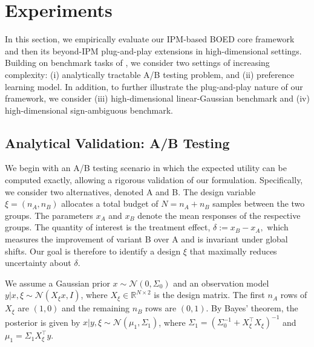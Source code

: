 \documentclass[twoside,11pt]{article}
\begin{document}
\section{Experiments}
\label{sec:experiments}
In this section, we empirically evaluate our IPM-based BOED core framework and then its beyond-IPM plug-and-play extensions in high-dimensional settings. Building on benchmark tasks of \cite{foster2019variational}, we consider two settings of increasing complexity: (i) analytically tractable A/B testing problem, and (ii) preference learning model. In addition, to further illustrate the plug-and-play nature of our framework, we consider (iii) high-dimensional linear-Gaussian benchmark and (iv) high-dimensional sign-ambiguous benchmark.

\subsection{Analytical Validation: A/B Testing}
\label{sec:exp_ab_test}

We begin with an A/B testing scenario in which the expected utility can be computed exactly, allowing a rigorous validation of our formulation. Specifically, we consider two alternatives, denoted A and B. The design variable $\xi = (n_A, n_B)$ allocates a total budget of $N = n_A + n_B$ samples between the two groups. The parameters $x_A$ and $x_B$ denote the mean responses of the respective groups. The quantity of interest is the treatment effect, $\delta := x_B - x_A,$
which measures the improvement of variant B over A and is invariant under global shifts. Our goal is therefore to identify a design $\xi$ that maximally reduces uncertainty about $\delta$.

We assume a Gaussian prior $x \sim \mathcal{N}(0, \Sigma_0)$ and an observation model $y | x, \xi \sim \mathcal{N}(X_\xi x, I)$, where $X_\xi \in \mathbb{R}^{N \times 2}$ is the design matrix. The first $n_A$ rows of $X_\xi$ are $(1, 0)$ and the remaining $n_B$ rows are $(0, 1)$. By Bayes' theorem, the posterior is given by $x | y, \xi \sim \mathcal{N}(\mu_1, \Sigma_1)$, where $\Sigma_1 = (\Sigma_0^{-1} + X_\xi^\top X_\xi)^{-1}$ and $\mu_1 = \Sigma_1 X_\xi^\top y$.
\end{document}
